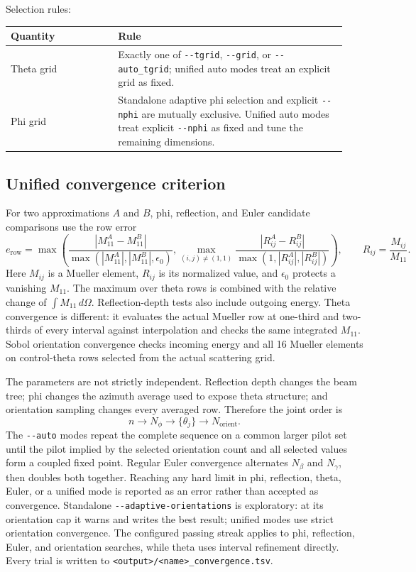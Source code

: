 \documentclass[
  10pt,
  a4paper,
]{article}
\begin{document}
Selection rules:

\begin{longtable}[]{@{}L{0.30\linewidth}L{0.64\linewidth}@{}}
\toprule\noalign{}
Quantity & Rule \\
\midrule\noalign{}
\endhead
\bottomrule\noalign{}
\endlastfoot
Theta grid & Exactly one of \texttt{-\/-tgrid}, \texttt{-\/-grid}, or
\texttt{-\/-auto\_tgrid}; unified auto modes treat an explicit grid as fixed. \\
Phi grid & Standalone adaptive phi selection and explicit
\texttt{-\/-nphi} are mutually exclusive. Unified auto modes treat explicit
\texttt{-\/-nphi} as fixed and tune the remaining dimensions. \\
\end{longtable}

\subsection{Unified convergence criterion}

For two approximations \(A\) and \(B\), phi, reflection, and Euler
candidate comparisons use the row error
\[
 e_{\mathrm{row}}=\max\!\left(
 \frac{|M^{A}_{11}-M^{B}_{11}|}
      {\max(|M^{A}_{11}|,|M^{B}_{11}|,\epsilon_0)},
 \max_{(i,j)\ne(1,1)}
 \frac{|R^{A}_{ij}-R^{B}_{ij}|}
      {\max(1,|R^{A}_{ij}|,|R^{B}_{ij}|)}
 \right),
 \qquad R_{ij}=\frac{M_{ij}}{M_{11}}.
\]
Here \(M_{ij}\) is a Mueller element, \(R_{ij}\) is its normalized
value, and \(\epsilon_0\) protects a vanishing \(M_{11}\).  The maximum
over theta rows is combined with the relative change of
\(\int M_{11}\,d\Omega\). Reflection-depth tests also include outgoing
energy. Theta convergence is different: it evaluates the actual Mueller row
at one-third and two-thirds of every interval against interpolation and checks
the same integrated \(M_{11}\). Sobol orientation convergence checks incoming
energy and all 16 Mueller elements on control-theta rows selected from the
actual scattering grid.

The parameters are not strictly independent. Reflection depth changes the
beam tree; phi changes the azimuth average used to expose theta structure;
and orientation sampling changes every averaged row. Therefore the joint
order is
\[
 n\longrightarrow N_\phi\longrightarrow
 \{\theta_j\}\longrightarrow N_{\mathrm{orient}}.
\]
The \texttt{-\/-auto} modes repeat the complete sequence on a common larger
pilot set until the pilot implied by the selected orientation count and all
selected values form a coupled fixed point. Regular Euler convergence
alternates \(N_\beta\) and \(N_\gamma\), then doubles both together. Reaching
any hard limit in phi, reflection, theta, Euler, or a unified mode is reported
as an error rather than accepted as convergence. Standalone
\texttt{-\/-adaptive-orientations} is exploratory: at its orientation cap it
warns and writes the best result; unified modes use strict orientation
convergence. The configured passing streak applies to phi, reflection, Euler,
and orientation searches, while theta uses interval refinement directly.
Every trial is written to
\texttt{<output>/<name>\_convergence.tsv}.
\end{document}

